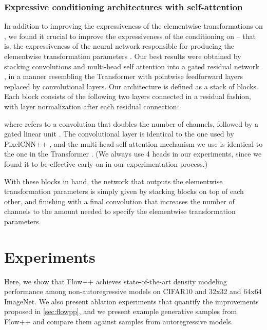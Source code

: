 \documentclass{article}
\begin{document}
\subsubsection{Expressive conditioning architectures with self-attention}
In addition to improving the expressiveness of the elementwise transformations on , we found it crucial to improve the expressiveness of the conditioning on  -- that is, the expressiveness of the neural network responsible for producing the elementwise transformation parameters . Our best results were obtained by stacking convolutions and multi-head self attention into a gated residual network \citep{mishra2018simple,chen2017pixelsnail}, in a manner resembling the Transformer \citep{vaswani2017attention} with pointwise feedforward layers replaced by  convolutional layers. Our architecture is defined as a stack of blocks. Each block consists of the following two layers connected in a residual fashion, with layer normalization \citep{ba2016layer} after each residual connection:

where  refers to a  convolution that doubles the number of channels, followed by a gated linear unit \citep{dauphin2016language}.
The convolutional layer is identical to the one used by \mbox{PixelCNN++} \citep{salimans2017pixelcnn++}, and the multi-head self attention mechanism we use is identical to the one in the Transformer \citep{vaswani2017attention}. (We always use 4 heads in our experiments, since we found it to be effective early on in our experimentation process.)

With these blocks in hand, the network that outputs the elementwise transformation parameters is simply given by stacking blocks on top of each other, and finishing with a final convolution that increases the number of channels to the amount needed to specify the elementwise transformation parameters.

\section{Experiments}

Here, we show that Flow++ achieves state-of-the-art density modeling performance among non-autoregressive models on CIFAR10 and 32x32 and 64x64 ImageNet. We also present ablation experiments that quantify the improvements proposed in \cref{sec:flowpp}, and we present example generative samples from Flow++ and compare them against samples from autoregressive models.
\end{document}
